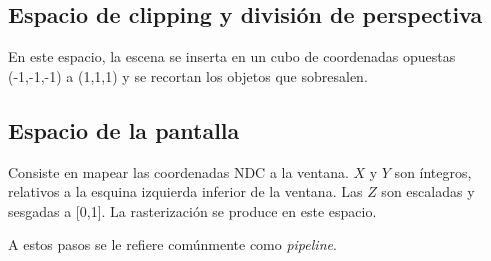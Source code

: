 \subsection{Espacio de clipping y división de perspectiva}
En este espacio, la escena se inserta en un cubo de coordenadas opuestas (-1,-1,-1) a (1,1,1) y se recortan los objetos que sobresalen.

\subsection{Espacio de la pantalla}
Consiste en mapear las coordenadas NDC a la ventana. $X$ y $Y$ son íntegros, relativos a la esquina izquierda inferior de la ventana. Las $Z$ son escaladas y sesgadas a [0,1]. La rasterización se produce en este espacio.

\hfill \break \break
A estos pasos se le refiere comúnmente como \textit{pipeline}.
